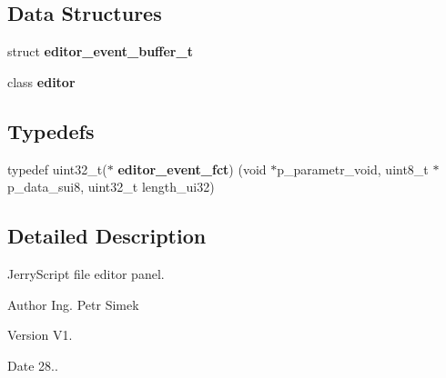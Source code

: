 \subsection*{Data Structures}
\begin{DoxyCompactItemize}
\item 
struct \textbf{ editor\+\_\+event\+\_\+buffer\+\_\+t}
\item 
class \textbf{ editor}
\end{DoxyCompactItemize}
\subsection*{Typedefs}
\begin{DoxyCompactItemize}
\item 
typedef uint32\+\_\+t($\ast$ \textbf{ editor\+\_\+event\+\_\+fct}) (void $\ast$p\+\_\+parametr\+\_\+void, uint8\+\_\+t $\ast$p\+\_\+data\+\_\+sui8, uint32\+\_\+t length\+\_\+ui32)
\end{DoxyCompactItemize}


\subsection{Detailed Description}
Jerry\+Script file editor panel. 

\begin{DoxyAuthor}{Author}
Ing. Petr Simek 
\end{DoxyAuthor}
\begin{DoxyVersion}{Version}
V1. 
\end{DoxyVersion}
\begin{DoxyDate}{Date}
28.. 
\end{DoxyDate}
